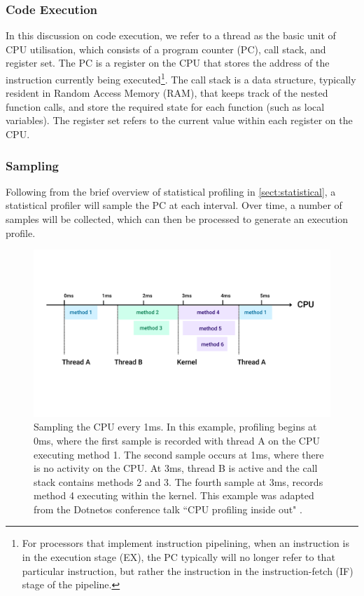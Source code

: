 \subsubsection{Code Execution}

In this discussion on code execution, we refer to a thread as the basic unit of CPU utilisation, which consists of a program counter (PC), call stack, and register set. The PC is a register on the CPU that stores the address of the instruction currently being executed\footnote{For processors that implement instruction pipelining, when an instruction is in the execution stage (EX), the PC typically will no longer refer to that particular instruction, but rather the instruction in the instruction-fetch (IF) stage of the pipeline.}. The call stack is a data structure, typically resident in Random Access Memory (RAM), that keeps track of the nested function calls, and store the required state for each function (such as local variables). The register set refers to the current value within each register on the CPU. 

\subsubsection{Sampling}

Following from the brief overview of statistical profiling in \ref{sect:statistical}, a statistical profiler will sample the PC at each interval. Over time, a number of samples will be collected, which can then be processed to generate an execution profile. 

\begin{figure}[h!]
    \includegraphics[width=\linewidth]{report-a_sampling_timeline}
    \caption{Sampling the CPU every 1ms. In this example, profiling begins at 0ms, where the first sample is recorded with thread A on the CPU executing method 1. The second sample occurs at 1ms, where there is no activity on the CPU. At 3ms, thread B is active and the call stack contains methods 2 and 3. The fourth sample at 3ms, records method 4 executing within the kernel. This example was adapted from the Dotnetos conference talk ``CPU profiling inside out" \cite{YouTubeDotnetosCPUProfling}.}
    \label{fig:sel4_microkernel}
\end{figure}


